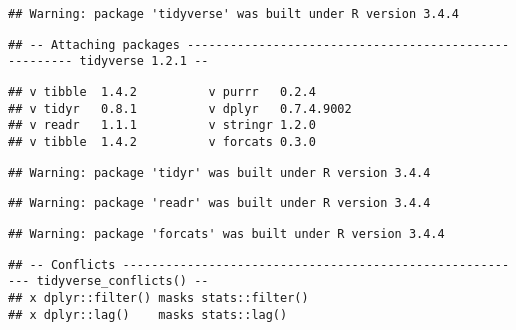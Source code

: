 \documentclass[]{article}
\begin{document}
\begin{verbatim}
## Warning: package 'tidyverse' was built under R version 3.4.4
\end{verbatim}

\begin{verbatim}
## -- Attaching packages ------------------------------------------------------ tidyverse 1.2.1 --
\end{verbatim}

\begin{verbatim}
## v tibble  1.4.2          v purrr   0.2.4     
## v tidyr   0.8.1          v dplyr   0.7.4.9002
## v readr   1.1.1          v stringr 1.2.0     
## v tibble  1.4.2          v forcats 0.3.0
\end{verbatim}

\begin{verbatim}
## Warning: package 'tidyr' was built under R version 3.4.4
\end{verbatim}

\begin{verbatim}
## Warning: package 'readr' was built under R version 3.4.4
\end{verbatim}

\begin{verbatim}
## Warning: package 'forcats' was built under R version 3.4.4
\end{verbatim}

\begin{verbatim}
## -- Conflicts --------------------------------------------------------- tidyverse_conflicts() --
## x dplyr::filter() masks stats::filter()
## x dplyr::lag()    masks stats::lag()
\end{verbatim}
\end{document}
